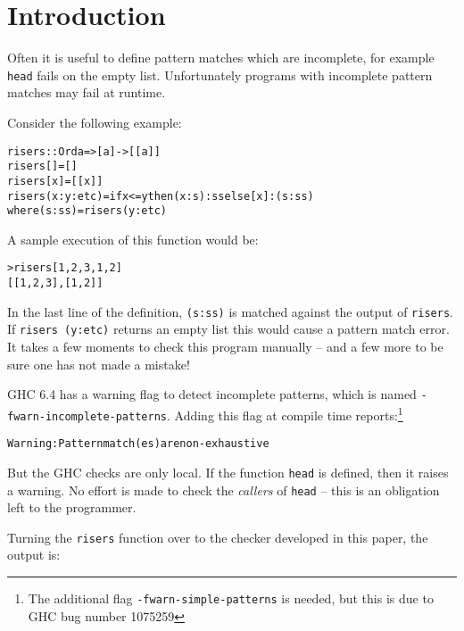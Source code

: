 \documentclass[book]{tfp05symp}
\newcommand{\T}[1]{\texttt{#1}}
\newenvironment{code}{\begin{alltt}\small}{\end{alltt}}
\begin{document}
\section{Introduction}
\label{sec:introduction}

Often it is useful to define pattern matches which are incomplete,
for example \T{head} fails on the empty list. Unfortunately programs
with incomplete pattern matches may fail at runtime.

Consider the following example:

\begin{code}
risers :: Ord a => [a] -> [[a]]
risers [] = []
risers [x] = [[x]]
risers (x:y:etc) = if x <= y then (x:s):ss else [x]:(s:ss)
    where (s:ss) = risers (y:etc)
\end{code}

A sample execution of this function would be:

\begin{code}
> risers [1,2,3,1,2]
[[1,2,3],[1,2]]
\end{code}

In the last line of the definition, \T{(s:ss)} is matched against
the output of \T{risers}. If \T{risers (y:etc)} returns an empty
list this would cause a pattern match error. It takes a few
moments to check this program manually -- and a few more to be
sure one has not made a mistake!

GHC \cite{ghc_manual} 6.4 has a warning flag to detect incomplete
patterns, which is named \T{-fwarn-incomplete-patterns}. Adding
this flag at compile time reports:\footnote{The additional flag
\T{-fwarn-simple-patterns} is needed, but this is due to GHC bug
number 1075259}

\begin{code}
Warning: Pattern match(es) are non-exhaustive
\end{code}

\begin{comment}
The Bugs (12.2.1) section of the manual notes that the checks are
sometimes wrong, particularly with string patterns or guards, and
that this part of the compiler ``needs an overhaul really''
\cite{ghc_manual}.
\end{comment}

But the GHC checks are only local. If the function \T{head} is
defined, then it raises a warning. No effort is made to check the
\textit{callers} of \T{head} -- this is an obligation left to the
programmer.

Turning the \T{risers} function over to the checker developed in
this paper, the output is:
\end{document}
